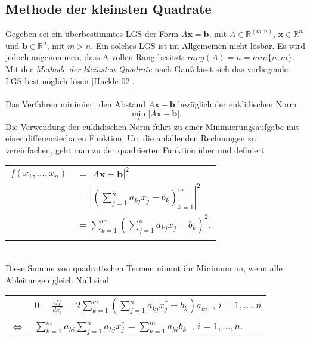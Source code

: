 \subsection{Methode der kleinsten Quadrate}
\label{methodederkleinstenquadrate}
Gegeben sei ein überbestimmtes LGS der Form $A\bm{x} = \bm{b}$, mit $A \in \mathbb{R}^{(m,n)}$, $\bm{x} \in \mathbb{R}^m$ und $\bm{b} \in \mathbb{R}^n$, mit $m > n$. Ein solches LGS ist im Allgemeinen nicht lösbar. Es wird jedoch angenommen, dass A vollen Rang besitzt: $rang(A) = n = min\{n, m\}$. Mit der \emph{Methode der kleinsten Quadrate} nach Gauß lässt sich das vorliegende LGS bestmöglich lösen [Huckle 02].\\
\\
Das Verfahren minimiert den Abstand $A\bm{x} - \bm{b}$ bezüglich der euklidischen Norm
\begin{equation}
\min_{\bm{x}} |A\bm{x} - \bm{b}|. \nonumber
\end{equation}
Die Verwendung der euklidischen Norm führt zu einer Minimierungsaufgabe mit einer differenzierbaren Funktion. Um die anfallenden Rechnungen zu vereinfachen, geht man zu der quadrierten Funktion über und definiert
\vspace{11pt} \\
\begin{tabular}[m]{ll}
$f(x_1,\ldots,x_n)$ & $= |A\bm{x} - \bm{b}|^2$ \nonumber \\
& $= |(\sum\limits_{j=1}^na_{kj}x_j - b_k)_{k=1}^m|^2$ \nonumber \\
& $= \sum\limits_{k=1}^m(\sum\limits_{j=1}^na_{kj}x_j - b_k)^2$. \nonumber \\
\nonumber
\end{tabular}
\vspace{11pt} \\
Diese Summe von quadratischen Termen nimmt ihr Minimum an, wenn alle Ableitungen gleich Null sind
\vspace{11pt} \\
\begin{tabular}[m]{ll}
& $0 = \frac{df}{dx_i^*} = 2 \sum\limits_{k=1}^m (\sum\limits_{j=1}^na_{kj} x_j^* - b_k) a_{ki}$\ , \hspace{1cm} $i = 1,\ldots,n$ \\
$\Leftrightarrow$ & $\sum\limits_{k=1}^m a_{ki} \sum\limits_{j=1}^n a_{kj} x_j^* = \sum\limits_{k=1}^m a_{ki} b_k$\ , \hspace{1cm} $i = 1,\ldots,n$.\\
\end{tabular}
